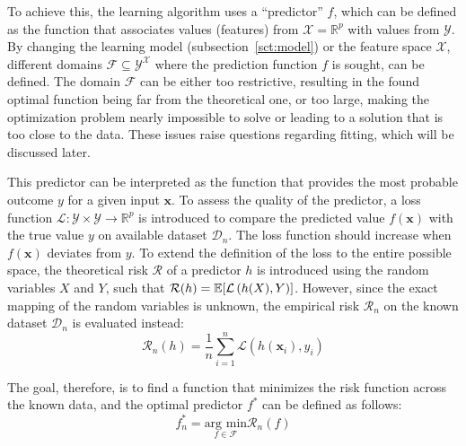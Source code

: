 \documentclass[main]{subfiles}
\begin{document}
To achieve this, the learning algorithm uses a ``predictor'' $f$, which can be defined as the function that associates values (features) from $\mathcal{X}=\mathbb{R}^{p}$ with values from $\mathcal{Y}$. By changing the learning model (subsection~\ref{sct:model}) or the feature space $\mathcal{X}$, different domains $\mathcal{F}\subseteq{\mathcal{Y}}^{\mathcal{X}}$ where the prediction function $f$ is sought, can be defined. The domain $\mathcal{F}$ can be either too restrictive, resulting in the found optimal function being far from the theoretical one, or too large, making the optimization problem nearly impossible to solve or leading to a solution that is too close to the data. These issues raise questions regarding fitting, which will be discussed later.

This predictor can be interpreted as the function that provides the most probable outcome $y$ for a given input $\mathbf{x}$. To assess the quality of the predictor, a loss function $\mathcal{L}:\mathcal{Y}\times\mathcal{Y} \rightarrow \mathbb{R}^{p}$ is introduced to compare the predicted value $f(\mathbf{x})$ with the true value $y$ on available dataset $\mathcal{D}_{n}$. The loss function should increase when $f(\mathbf{x})$ deviates from $y$. To extend the definition of the loss to the entire possible space, the theoretical risk $\mathcal{R}$ of a predictor $h$ is introduced using the random variables $X$ and $Y$, such that $\mathcal{R}(h) = \mathbb{E}{\left[\mathcal{L}\left(h(X),Y\right)\right]}$. However, since the exact mapping of the random variables is unknown, the empirical risk $\mathcal{R}_n$ on the known dataset $\mathcal{D}_{n}$ is evaluated instead:
\begin{equation}\label{eq:risk}
  \mathcal{R}_n(h) = \frac{1}{n}\sum_{i=1}^n \mathcal{L}\left(h(\mathbf{x}_i),y_i\right)
\end{equation}

The goal, therefore, is to find a function that minimizes the risk function across the known data, and the optimal predictor $f^*$ can be defined as follows:
\begin{equation}\label{eq:min_f}
  f_n^* = \underset{f\in\mathcal{F}}{\text{arg min}} \mathcal{R}_n(f)
\end{equation}
\end{document}
